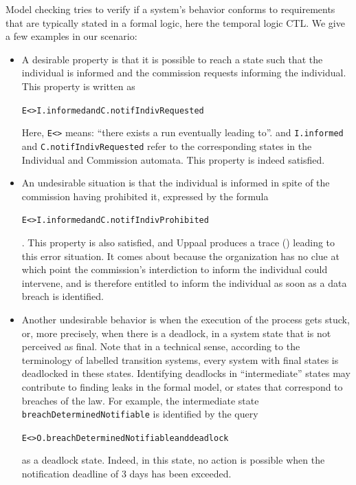 Model checking tries to verify if a system's behavior conforms to requirements
that are typically stated in a formal logic, here the temporal logic CTL. We
give a few  examples in our scenario:

\begin{itemize}
\item A desirable property is that it is possible to reach a state such that the
  individual is informed and the commission requests informing the
  individual. This property is written as
  \begin{alltt}E<>I.informed and C.notifIndivRequested \end{alltt}
  Here, \texttt{E<>} means: ``there exists a run
  eventually leading to''. and \texttt{I.informed} and
  \texttt{C.notifIndivRequested} refer to the corresponding states in the
  Individual and Commission automata. This property is indeed satisfied.

  
\item An undesirable situation is that the individual is informed in spite of
  the commission having prohibited it, expressed by the formula
  \begin{alltt}E<> I.informed and C.notifIndivProhibited\end{alltt}. This property is also satisfied,
  and Uppaal produces a trace () leading to this error
  situation. It comes about because the organization has no clue at which
  point the commission's interdiction to inform the individual could
  intervene, and is therefore entitled to inform the individual as soon as a
  data breach is identified.

\item Another undesirable behavior is when the execution of the process gets
  stuck, or, more precisely, when there is a deadlock, in a system state that
  is not perceived as final. Note that in a technical sense, according to the
  terminology of labelled transition systems, every system with final states
  is deadlocked in these states. Identifying deadlocks in ``intermediate''
  states may contribute to finding leaks in the formal model, or states that
  correspond to breaches of the law. For example, the intermediate state
  \texttt{breachDeterminedNotifiable} is identified by the query
  \begin{alltt}E<> O.breachDeterminedNotifiable and deadlock\end{alltt}
  as a deadlock state. Indeed, in
  this state, no action is possible when the notification deadline of 3 days
  has been exceeded.
\end{itemize}


